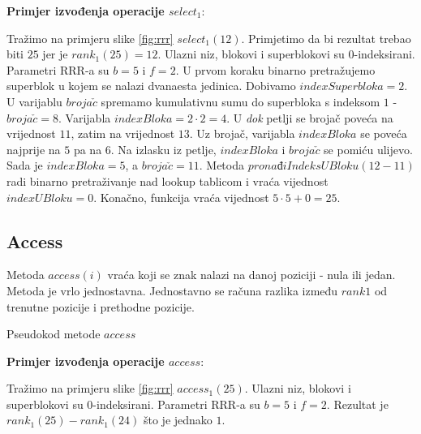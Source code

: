 \documentclass[times, utf8, seminar, numeric]{fer}
\begin{document}
\textbf{Primjer izvođenja operacije $select_1$}:

Tražimo na primjeru slike \ref{fig:rrr} $select_1(12)$. Primjetimo da bi rezultat trebao biti $25$ jer je $rank_1(25)=12$. Ulazni niz, blokovi i superblokovi su 0-indeksirani. Parametri RRR-a su $b=5$ i $f=2$. U prvom koraku binarno pretražujemo superblok u kojem se nalazi dvanaesta jedinica. Dobivamo $indexSuperbloka=2$. U varijablu $broja\check{c}$ spremamo kumulativnu sumu do superbloka s indeksom $1$ - $broja\check{c}=8$. Varijabla $indexBloka=2 \cdot 2=4$. U \textit{dok} petlji se brojač poveća na vrijednost $11$, zatim na vrijednost $13$. Uz brojač, varijabla $indexBloka$ se poveća najprije na $5$ pa na $6$. Na izlasku iz petlje, $indexBloka$ i $broja\check{c}$ se pomiću ulijevo. Sada je $indexBloka=5$, a $broja\check{c}=11$. Metoda $pronađiIndeksUBloku(12-11)$ radi binarno pretraživanje nad lookup tablicom i vraća vijednost $indexUBloku=0$. Konačno, funkcija vraća vijednost $5 \cdot 5 + 0=25$.

\subsection{Access}
Metoda $access(i)$ vraća koji se znak nalazi na danoj poziciji - nula ili jedan. Metoda je vrlo jednostavna. Jednostavno se računa razlika između $rank1$ od trenutne pozicije i prethodne pozicije.

\begin{algorithm}[H]
 \caption{Pseudokod metode $access$}
\end{algorithm}


\textbf{Primjer izvođenja operacije $access$}:

Tražimo na primjeru slike \ref{fig:rrr} $access_1(25)$. Ulazni niz, blokovi i superblokovi su 0-indeksirani. Parametri RRR-a su $b=5$ i $f=2$. Rezultat je $rank_1(25)-rank_1(24)$ što je jednako $1$.
\end{document}
